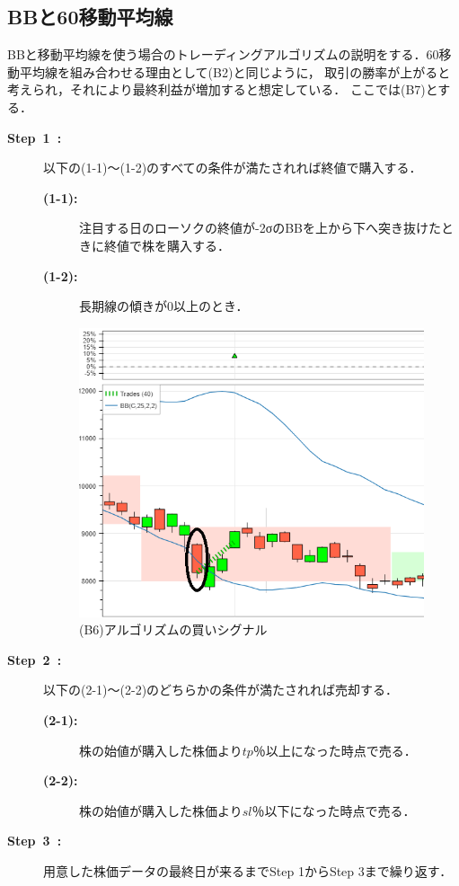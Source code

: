 \subsection{BBと60移動平均線}
BBと移動平均線を使う場合のトレーディングアルゴリズムの説明をする．60移動平均線を組み合わせる理由として(B2)と同じように，
取引の勝率が上がると考えられ，それにより最終利益が増加すると想定している．
ここでは(B7)とする．
\begin{description}
  \item[\textbf{Step~1~:}]以下の(1-1)～(1-2)のすべての条件が満たされれば終値で購入する．
  \begin{description}
    \item[\textbf{(1-1):}]注目する日のローソクの終値が-2σのBBを上から下へ突き抜けたときに終値で株を購入する．
    \item[\textbf{(1-2):}]長期線の傾きが0以上のとき．
   \end{description}  
   \begin{figure}[t]
    \centering
     \includegraphics[width=110mm]{fig/bbonly_paint.png}
     \caption{(B6)アルゴリズムの買いシグナル}
     \label{fig:bbonly}
    \end{figure}
  \item[\textbf{Step~2~:}]以下の(2-1)～(2-2)のどちらかの条件が満たされれば売却する．
   \begin{description}
    \item[\textbf{(2-1):}]株の始値が購入した株価より$tp$％以上になった時点で売る．
    \item[\textbf{(2-2):}]株の始値が購入した株価より$sl$％以下になった時点で売る． 
   \end{description}
  \item[\textbf{Step~3~:}]用意した株価データの最終日が来るまでStep 1からStep 3まで繰り返す．
  \end{description}
  
